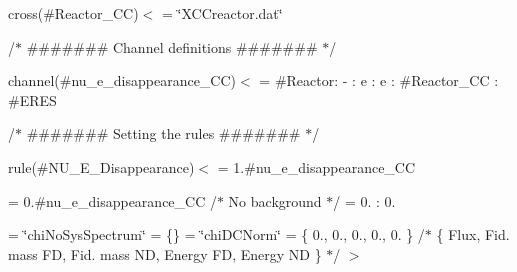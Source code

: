 cross(\#\+Reactor\+\_\+\+CC)$<$  = \char`\"{}\+X\+C\+Creactor.\+dat\char`\"{} \begin{quote}


\end{quote}


/$\ast$ \#\#\#\#\#\#\# Channel definitions \#\#\#\#\#\#\# $\ast$/

channel(\#nu\+\_\+e\+\_\+disappearance\+\_\+\+CC)$<$  = \#\+Reactor\+: -\/ \+: e \+: e \+: \#\+Reactor\+\_\+\+CC \+: \#\+E\+R\+ES \begin{quote}


\end{quote}


/$\ast$ \#\#\#\#\#\#\# Setting the rules \#\#\#\#\#\#\# $\ast$/

rule(\#\+N\+U\+\_\+\+E\+\_\+\+Disappearance)$<$  = 1.\#nu\+\_\+e\+\_\+disappearance\+\_\+\+CC

= 0.\#nu\+\_\+e\+\_\+disappearance\+\_\+\+CC /$\ast$ No background $\ast$/  = 0. \+: 0.

= \char`\"{}chi\+No\+Sys\+Spectrum\char`\"{}  = \{\}  = \char`\"{}chi\+D\+C\+Norm\char`\"{}  = \{ 0., 0., 0., 0., 0. \} /$\ast$ \{ Flux, Fid. mass FD, Fid. mass ND, Energy FD, Energy ND \} $\ast$/ $>$ 